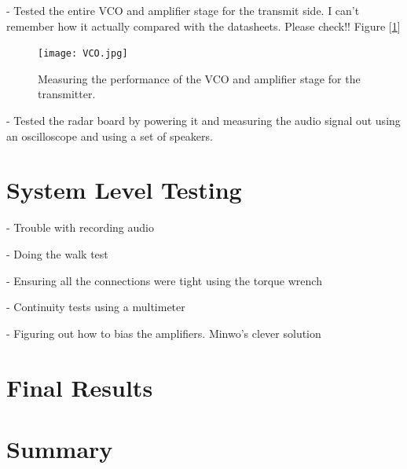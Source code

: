 \documentclass[reprint, aps, prl]{revtex4-1}
\begin{document}
- Tested the entire VCO and amplifier stage for the transmit side. I can't remember how it actually compared with the datasheets. Please check!! Figure [\ref{fig:VCO}]

\begin{figure}[!htbp]
    \centering
    \texttt{[image: VCO.jpg]}
    \caption{Measuring the performance of the VCO and amplifier stage for the transmitter.}
    \label{fig:VCO}
\end{figure}

- Tested the radar board by powering it and measuring the audio signal out using an oscilloscope and using a set of speakers.

\section*{System Level Testing}

- Trouble with recording audio

- Doing the walk test

- Ensuring all the connections were tight using the torque wrench

- Continuity tests using a multimeter

- Figuring out how to bias the amplifiers. Minwo's clever solution


\section*{Final Results}


\section*{Summary}
\end{document}
